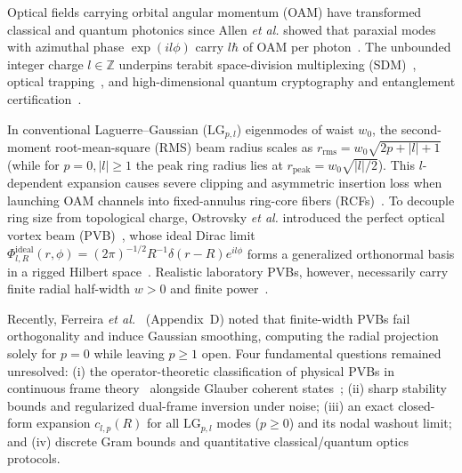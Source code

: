 \documentclass[aps,pra,reprint,amsmath,amssymb,floatfix,longbibliography]{revtex4-2}
\providecommand{\abs}[1]{\lvert#1\rvert}
\begin{document}
Optical fields carrying orbital angular momentum (OAM) have transformed classical and quantum photonics since Allen \emph{et al.} showed that paraxial modes with azimuthal phase $\exp(il\phi)$ carry $l\hbar$ of OAM per photon~\cite{Allen1992}. The unbounded integer charge $l \in \mathbb{Z}$ underpins terabit space-division multiplexing (SDM)~\cite{Bozinovic2013,Willner2015,Wang2019}, optical trapping~\cite{Padgett2011}, and high-dimensional quantum cryptography and entanglement certification~\cite{Cerf2002,Mirhosseini2015,Bavaresco2018,Erhard2018}.

In conventional Laguerre--Gaussian ($\mathrm{LG}_{p,l}$) eigenmodes of waist $w_0$, the second-moment root-mean-square (RMS) beam radius scales as $r_{\mathrm{rms}} = w_0\sqrt{2p+\abs{l}+1}$~\cite{Allen1992,Siegman1986} (while for $p=0,\abs{l}\ge 1$ the peak ring radius lies at $r_{\mathrm{peak}} = w_0\sqrt{\abs{l}/2}$). This $l$-dependent expansion causes severe clipping and asymmetric insertion loss when launching OAM channels into fixed-annulus ring-core fibers (RCFs)~\cite{Ramachandran2009,Brunet2014,Gregg2015,Canas2021,RojasRojas2021,Villalba2023}. To decouple ring size from topological charge, Ostrovsky \emph{et al.} introduced the perfect optical vortex beam (PVB)~\cite{Ostrovsky2013,Vaity2015}, whose ideal Dirac limit $\Phi_{l,R}^{\mathrm{ideal}}(r,\phi) = (2\pi)^{-1/2} R^{-1}\delta(r-R)e^{il\phi}$ forms a generalized orthonormal basis in a rigged Hilbert space~\cite{Gelfand1964}. Realistic laboratory PVBs, however, necessarily carry finite radial half-width $w > 0$ and finite power~\cite{Vaity2015,Reddy2016}.

Recently, Ferreira \emph{et al.}~\cite{Ferreira2026} (Appendix~D) noted that finite-width PVBs fail orthogonality and induce Gaussian smoothing, computing the radial projection solely for $p=0$ while leaving $p \ge 1$ open. Four fundamental questions remained unresolved: (i) the operator-theoretic classification of physical PVBs in continuous frame theory~\cite{Duffin1952,Daubechies1990,Ali1993,Christensen2016} alongside Glauber coherent states~\cite{Klauder1985,Perelomov1986,Gazeau2009}; (ii) sharp stability bounds and regularized dual-frame inversion under noise; (iii) an exact closed-form expansion $c_{l,p}(R)$ for all $\mathrm{LG}_{p,l}$ modes ($p \ge 0$) and its nodal washout limit; and (iv) discrete Gram bounds and quantitative classical/quantum optics protocols.
\end{document}
